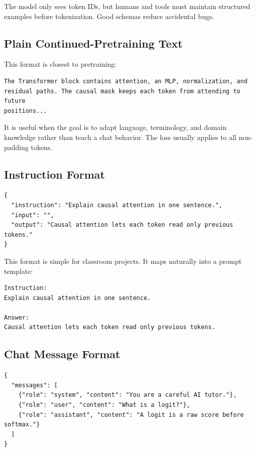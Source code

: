 The model only sees token IDs, but humans and tools must maintain structured examples before tokenization. Good schemas reduce accidental bugs.

\subsection*{Plain Continued-Pretraining Text}

This format is closest to pretraining:

\begin{lstlisting}
The Transformer block contains attention, an MLP, normalization, and
residual paths. The causal mask keeps each token from attending to future
positions...
\end{lstlisting}

It is useful when the goal is to adapt language, terminology, and domain knowledge rather than teach a chat behavior. The loss usually applies to all non-padding tokens.

\subsection*{Instruction Format}

\begin{lstlisting}
{
  "instruction": "Explain causal attention in one sentence.",
  "input": "",
  "output": "Causal attention lets each token read only previous tokens."
}
\end{lstlisting}

This format is simple for classroom projects. It maps naturally into a prompt template:

\begin{lstlisting}
Instruction:
Explain causal attention in one sentence.

Answer:
Causal attention lets each token read only previous tokens.
\end{lstlisting}

\subsection*{Chat Message Format}

\begin{lstlisting}
{
  "messages": [
    {"role": "system", "content": "You are a careful AI tutor."},
    {"role": "user", "content": "What is a logit?"},
    {"role": "assistant", "content": "A logit is a raw score before softmax."}
  ]
}
\end{lstlisting}

